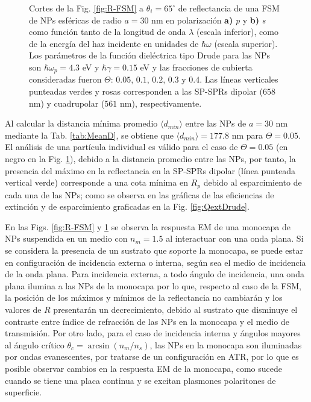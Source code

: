 \begin{figure}[h!]
	\caption{Cortes de la Fig. \ref{fig:R-FSM} a $\theta_i = 65^\circ$ de reflectancia de una FSM de NPs esféricas de radio $a=30$ nm en polarización \textbf{a)} \emph{p} y \textbf{b)} \emph{s} como función tanto de la longitud de onda $\lambda$ (escala inferior), como de la energía del haz incidente en unidades de $\hbar\omega$ (escala superior). Los parámetros de la función dieléctrica tipo Drude para las NPs son $\hbar\omega_p = 4.3$ eV y $\hbar\gamma = 0.15$ eV y las fracciones de cubierta consideradas fueron $\Theta$: $0. 05$, $0. 1$, $0. 2$, $0. 3$ y $0. 4$. Las líneas verticales punteadas verdes y rosas corresponden a las SP-SPRs dipolar ($658$ nm) y cuadrupolar ($561$ nm), respectivamente.}\label{fig:FSM-Cuts}
	\end{figure}	

Al calcular la distancia mínima promedio $\langle d_{min}\rangle$ entre las NPs  de $a = 30$ nm mediante la Tab. \eqref{tab:MeanD}, se obtiene que $\langle d_{min} \rangle = 177.8$ nm para $\Theta = 0.05$. El análisis de una partícula individual es válido para el caso de $\Theta=0.05$ (en negro en la Fig. \ref{fig:FSM-Cuts}), debido a la distancia promedio entre las NPs, por tanto, la presencia del máximo en la reflectancia en la SP-SPRs dipolar (línea punteada vertical verde) corresponde a una cota mínima en $R_p$ debido al esparcimiento de cada una de las NPs; como se observa en las gráficas de las eficiencias de extinción y de esparcimiento graficadas en la Fig. \ref{fig:QextDrude}.

En las Figs. \ref{fig:R-FSM} y \ref{fig:FSM-Cuts} se observa la respuesta EM de una monocapa de NPs suspendida en un medio con $n_m=1.5$ al interactuar con una onda plana. Si se considera la presencia de un sustrato que soporte la monocapa, se puede estar en configuraci\'on de incidencia externa o interna, seg\'un sea el medio de incidencia de la onda plana. Para incidencia externa, a todo ángulo de incidencia,  una onda plana ilumina a las NPs de la monocapa por lo que, respecto al caso de la FSM, la posición de los máximos y mínimos de la reflectancia no cambiarán y los valores de $R$ presentarán un decrecimiento, debido al sustrato que disminuye el contraste entre índice de refracción de las NPs en la monocapa y el medio de transmisión. Por otro lado, para el caso de incidencia interna y ángulos mayores al ángulo crítico $\theta_c = \arcsin(n_m/n_s)$, las NPs en la monocapa son iluminadas por ondas evanescentes, por tratarse de un configuración en ATR, por lo que es posible  observar cambios en la respuesta EM de la monocapa, como sucede  cuando se tiene una placa continua y se excitan plasmones polaritones de superficie.

